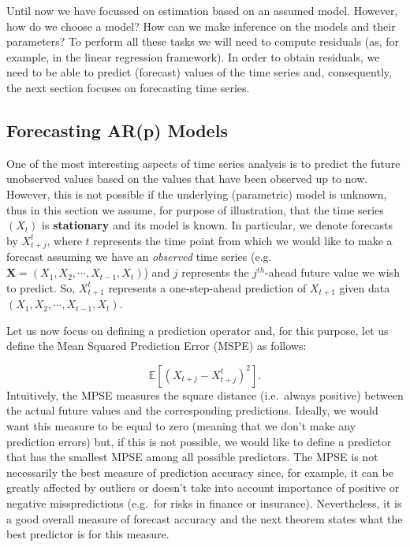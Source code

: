 \documentclass[]{book}
\theoremstyle{definition}
\theoremstyle{definition}
\theoremstyle{definition}
\theoremstyle{remark}
\begin{document}
Until now we have focussed on estimation based on an assumed model.
However, how do we choose a model? How can we make inference on the
models and their parameters? To perform all these tasks we will need to
compute residuals (as, for example, in the linear regression framework).
In order to obtain residuals, we need to be able to predict (forecast)
values of the time series and, consequently, the next section focuses on
forecasting time series.

\subsection{Forecasting AR(p) Models}\label{forecasting-arp-models}

One of the most interesting aspects of time series analysis is to
predict the future unobserved values based on the values that have been
observed up to now. However, this is not possible if the underlying
(parametric) model is unknown, thus in this section we assume, for
purpose of illustration, that the time series \((X_t)\) is
\textbf{stationary} and its model is known. In particular, we denote
forecasts by \(X^{t}_{t+j}\), where \(t\) represents the time point from
which we would like to make a forecast assuming we have an
\emph{observed} time series (e.g.
\(\mathbf{X} = (X_{1}, X_{2}, \cdots , X_{t-1}, X_t)\)) and \(j\)
represents the \(j^{th}\)-ahead future value we wish to predict. So,
\(X^{t}_{t+1}\) represents a one-step-ahead prediction of \(X_{t+1}\)
given data \((X_{1}, X_{2}, \cdots, X_{t-1}, X_{t})\).

Let us now focus on defining a prediction operator and, for this
purpose, let us define the Mean Squared Prediction Error (MSPE) as
follows:

\[\mathbb{E}[(X_{t+j} - X^{t}_{t+j})^2] .\] Intuitively, the MPSE
measures the square distance (i.e.~always positive) between the actual
future values and the corresponding predictions. Ideally, we would want
this measure to be equal to zero (meaning that we don't make any
prediction errors) but, if this is not possible, we would like to define
a predictor that has the smallest MPSE among all possible predictors.
The MPSE is not necessarily the best measure of prediction accuracy
since, for example, it can be greatly affected by outliers or doesn't
take into account importance of positive or negative misspredictions
(e.g.~for risks in finance or insurance). Nevertheless, it is a good
overall measure of forecast accuracy and the next theorem states what
the best predictor is for this measure.
\end{document}
